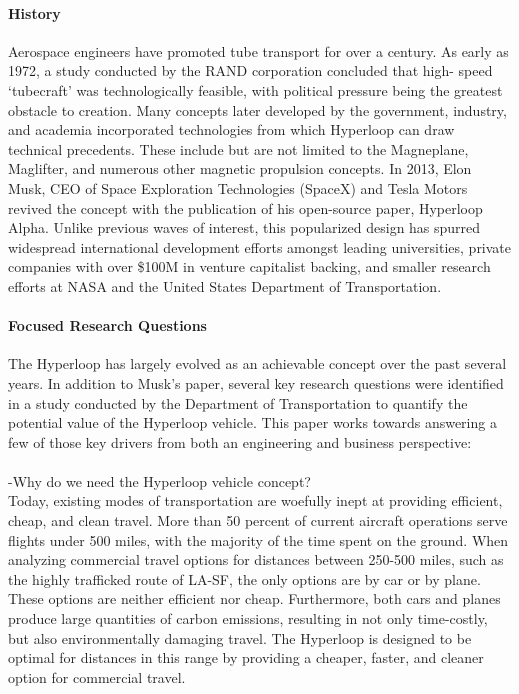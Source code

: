 \paragraph{History}

	Aerospace engineers have promoted tube transport for over a century. 
	As early as 1972, a study conducted by the RAND corporation concluded that high-
	speed `tubecraft' was technologically feasible, with political pressure being the greatest
	obstacle to creation.\cite{RAND} Many concepts later developed by
	the government, industry, and academia incorporated technologies from which
	Hyperloop can draw technical precedents.
	These include but are not limited to the Magneplane, Maglifter, and numerous
	other magnetic propulsion concepts. In 2013, Elon Musk, CEO of Space Exploration
	Technologies (SpaceX) and Tesla Motors revived the concept with the publication
	of his open-source paper, Hyperloop Alpha.\cite{Musk}
	Unlike previous waves of interest, this popularized design has spurred widespread international
	development efforts amongst leading universities, private companies with over
	\$100M in venture capitalist backing, and smaller research efforts at NASA and the
	United States Department of Transportation. \cite{Chin}

\paragraph{Focused Research Questions}

	The Hyperloop has largely evolved as an achievable concept over the past several years.
	In addition to Musk's paper, several key research questions were identified in a study conducted
	by the Department of Transportation to quantify the potential value of the
	Hyperloop vehicle. \cite{Volpe} This paper works towards answering a few of
	those key drivers from both an engineering and business perspective:\\

	\\
	-Why do we need the Hyperloop vehicle concept?\\

	Today, existing modes of transportation are woefully inept at providing efficient, cheap, and
	clean travel. More than 50 percent of current aircraft operations serve flights under 500
	miles, with the majority of the time spent on the ground. When analyzing commercial
	travel options for distances between 250-500 miles, such as the highly trafficked route of LA-SF,
	the only options are by car or by plane. These options are neither efficient nor cheap. Furthermore,
	both cars and planes produce large quantities of carbon emissions, resulting in not only
	time-costly, but also environmentally damaging travel. The Hyperloop is designed to be 
	optimal for distances in this range by providing a cheaper, faster, and cleaner
	option for commercial travel.\\

